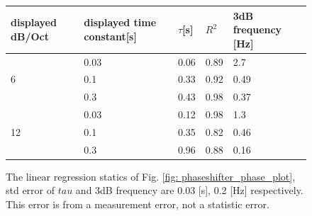\documentclass{article}
\begin{document}
 
 \begin{figure}[H]
  \begin{tabular}{  m{3cm} | m{4cm} | m{1cm} | m{1cm} | m{3cm}  } 

    displayed dB/Oct& displayed time constant[s] & $\tau$[s] & $R^2$ & 3dB frequency [Hz]\\ \hline
     \multirow{3}{*}{6}& 0.03  & 0.06 & 0.89 & 2.7 \\ \cline{2-5}
       & 0.1& 0.33 & 0.92 & 0.49\\ \cline{2-5}
       & 0.3& 0.43 & 0.98 & 0.37\\ \hline
       \multirow{3}{*}{12}& 0.03  & 0.12 & 0.98 & 1.3 \\ \cline{2-5}
       & 0.1& 0.35 & 0.82 & 0.46\\ \cline{2-5}
       & 0.3& 0.96 & 0.88 & 0.16\\ \hline
    
  \end{tabular}
  \caption{The linear regression statics of Fig. \ref{fig: phaseshifter_phase_plot}, std error of $tau$ and 3dB frequency are 0.03 [s], 0.2 [Hz] respectively.
  This error is from a measurement error, not a statistic error.}
  \label{fig: LPF statics}
\end{figure}
\end{document}
